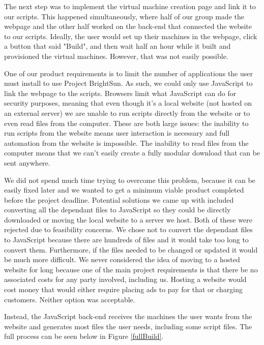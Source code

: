 \documentclass[openright]{report}
\begin{document}
\par The next step was to implement the virtual machine creation page and link it to our scripts. This happened simultaneously, where half of our group made the webpage and the other half worked on the back-end that connected the website to our scripts. Ideally, the user would set up their machines in the webpage, click a button that said "Build", and then wait half an hour while it built and provisioned the virtual machines. However, that was not easily possible.

\par One of our product requirements is to limit the number of applications the user must install to use Project BrightSun. As such, we could only use JavaScript to link the webpage to the scripts. Browsers limit what JavaScript can do for security purposes, meaning that even though it's a local website (not hosted on an external server) we are unable to run scripts directly from the website or to even read files from the computer. These are both large issues: the inability to run scripts from the website means user interaction is necessary and full automation from the website is impossible. The inability to read files from the computer means that we can't easily create a fully modular download that can be sent anywhere.

\par We did not spend much time trying to overcome this problem, because it can be easily fixed later and we wanted to get a minimum viable product completed before the project deadline. Potential solutions we came up with included converting all the dependant files to JavaScript so they could be directly downloaded or moving the local website to a server we host. Both of these were rejected due to feasibility concerns. We chose not to convert the dependant files to JavaScript because there are hundreds of files and it would take too long to convert them. Furthermore, if the files needed to be changed or updated it would be much more difficult. We never considered the idea of moving to a hosted website for long because one of the main project requirements is that there be no associated costs for any party involved, including us. Hosting a website would cost money that would either require placing ads to pay for that or charging customers. Neither option was acceptable.

\par Instead, the JavaScript back-end receives the machines the user wants from the website and generates most files the user needs, including some script files. The full process can be seen below in Figure \ref{fullBuild}.
\end{document}
